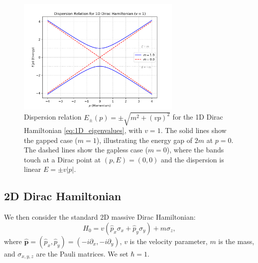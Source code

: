 \documentclass[11pt]{article}
\begin{document}
\begin{figure}[htbp] %
    \centering
    \includegraphics[width=0.7\textwidth]{1d_dirac_dispersion.png} %
    \caption{Dispersion relation $E_{\pm}(p) = \pm \sqrt{m^2 + (v p)^2}$ for the 1D Dirac Hamiltonian \eqref{eq:1D_eigenvalues}, with $v=1$. The solid lines show the gapped case ($m=1$), illustrating the energy gap of $2m$ at $p=0$. The dashed lines show the gapless case ($m=0$), where the bands touch at a Dirac point at $(p,E)=(0,0)$ and the dispersion is linear $E=\pm v|p|$.}
    \label{fig:1D_dispersion}
\end{figure}


\subsection{2D Dirac Hamiltonian}

We then consider the standard 2D massive Dirac Hamiltonian:
\begin{equation}
H_{0} = v (\hat{p}_x \sigma_x + \hat{p}_y \sigma_y) + m \sigma_z,
\end{equation}
where $\hat{\mathbf{p}} = (\hat{p}_x, \hat{p}_y) = (-i \partial_x, -i \partial_y)$, $v$ is the velocity parameter, $m$ is the mass, and $\sigma_{x,y,z}$ are the Pauli matrices. We set $\hbar=1$.
\end{document}
